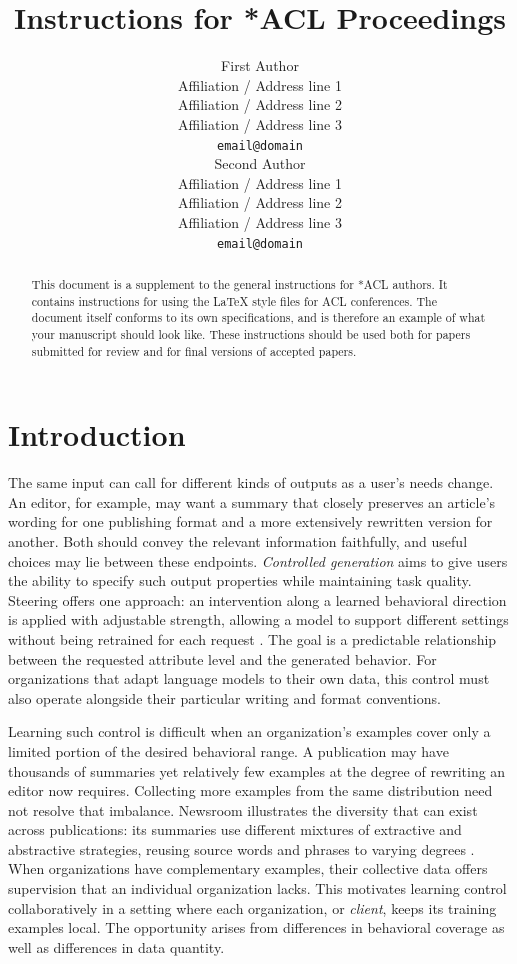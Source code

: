 \documentclass[11pt]{article}
\title{Instructions for *ACL Proceedings}
\author{First Author \\
  Affiliation / Address line 1 \\
  Affiliation / Address line 2 \\
  Affiliation / Address line 3 \\
  \texttt{email@domain} \\\And
  Second Author \\
  Affiliation / Address line 1 \\
  Affiliation / Address line 2 \\
  Affiliation / Address line 3 \\
  \texttt{email@domain} \\}
\begin{document}
\maketitle
\begin{abstract}
This document is a supplement to the general instructions for *ACL authors. It contains instructions for using the \LaTeX{} style files for ACL conferences.
The document itself conforms to its own specifications, and is therefore an example of what your manuscript should look like.
These instructions should be used both for papers submitted for review and for final versions of accepted papers.
\end{abstract}

\section{Introduction}
\label{sec:introduction}

The same input can call for different kinds of outputs as a user's needs change.
An editor, for example, may want a summary that closely preserves an article's wording for one publishing format and a more extensively rewritten version for another.
Both should convey the relevant information faithfully, and useful choices may lie between these endpoints.
\emph{Controlled generation} aims to give users the ability to specify such output properties while maintaining task quality.
Steering offers one approach: an intervention along a learned behavioral direction is applied with adjustable strength, allowing a model to support different settings without being retrained for each request \citep{rimsky-etal-2024-steering,fierro-roger-2026-weight}.
The goal is a predictable relationship between the requested attribute level and the generated behavior.
For organizations that adapt language models to their own data, this control must also operate alongside their particular writing and format conventions.

Learning such control is difficult when an organization's examples cover only a limited portion of the desired behavioral range.
A publication may have thousands of summaries yet relatively few examples at the degree of rewriting an editor now requires.
Collecting more examples from the same distribution need not resolve that imbalance.
Newsroom illustrates the diversity that can exist across publications: its summaries use different mixtures of extractive and abstractive strategies, reusing source words and phrases to varying degrees \citep{grusky-etal-2018-newsroom}.
When organizations have complementary examples, their collective data offers supervision that an individual organization lacks.
This motivates learning control collaboratively in a setting where each organization, or \emph{client}, keeps its training examples local.
The opportunity arises from differences in behavioral coverage as well as differences in data quantity.
\end{document}
